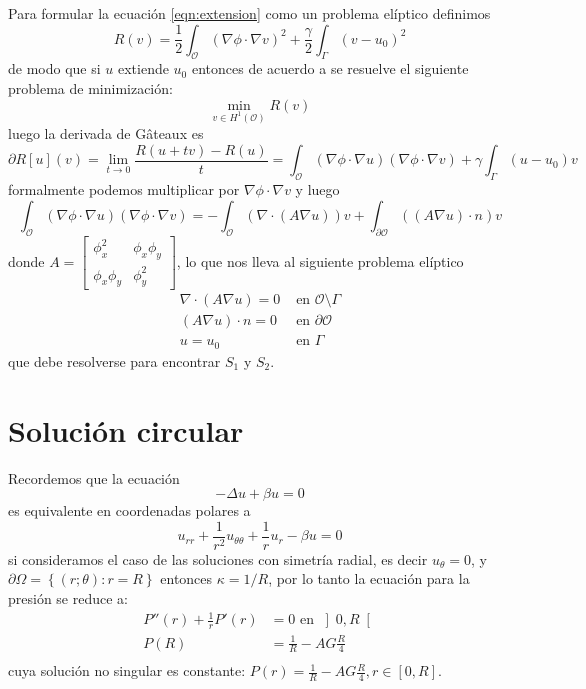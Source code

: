 Para formular la ecuación \ref{eqn:extension} como un problema elíptico definimos 
\[
R(v)= \frac{1}{2}\int_\mathcal{O} (\nabla \phi \cdot \nabla v)^2 + \frac{\gamma}{2}\int_\Gamma (v-u_0)^2
\] de modo que si $u$ extiende $u_0$ entonces de acuerdo a \citep{utz2018high}  se resuelve el  siguiente problema de minimización: 
\[
\min_{v\in H^1(\mathcal{O})} R(v) 
\]
luego la derivada de G\^{a}teaux es
\[
\partial R[u](v)=\lim_{t\to 0}\frac{R(u+tv)-R(u)}{t} = \int_\mathcal{O} (\nabla \phi \cdot \nabla u)(\nabla \phi \cdot \nabla v)+
\gamma \int_\Gamma (u-u_0)v
\]
formalmente podemos multiplicar por $\nabla \phi \cdot \nabla v$ y luego 
\[
\int_\mathcal{O} (\nabla \phi \cdot \nabla u)(\nabla \phi \cdot \nabla v)=-\int_\mathcal{O}( \nabla \cdot (A \nabla u))v+\int_{\partial\mathcal{O}}    ((A \nabla u) \cdot n)v
\]
donde $A=\begin{bmatrix} \phi_x^2 &  \phi_{x}\phi_{y} \\ \phi_{x}\phi_{y} & \phi_y^2 \end{bmatrix}$, lo que nos lleva al siguiente problema elíptico
\begin{equation}
	\begin{aligned}
		\nabla \cdot (A \nabla u)=0 & \text{ en }  \mathcal{O}\setminus \Gamma \\
		(A \nabla u) \cdot n=0 &	 \text{ en }  \partial \mathcal{O}\\
		u=u_0 &	 \text{ en } \Gamma
	\end{aligned}
\end{equation}
que debe resolverse para encontrar $S_1$ y $S_2$.


\section{Solución circular}
Recordemos que la ecuación 
\[
-\Delta u + \beta u =0
\]
es equivalente en coordenadas polares a
\[
u_{rr}+\frac{1}{r^2}u_{\theta\theta}+\frac{1}{r}u_r-\beta u=0
\]
si consideramos el caso de las soluciones con  simetría radial, es decir $u_{\theta}=0$, y $\partial\Omega=\left\{(r;\theta): r=R\right\}$  entonces $\kappa=1/R$, por lo tanto la ecuación para la presión se reduce a:
\[
\begin{aligned}
	P''(r)+\frac{1}{r}P'(r) &= 0 \text{ en }  \left]0,R\right[\\
	P(R) &= \frac{1}{R} - AG \frac{R}{4}  \\
\end{aligned}
\]	
cuya solución no singular es constante: $P(r) = \frac{1}{R} - AG \frac{R}{4},r\in[0,R]$.

